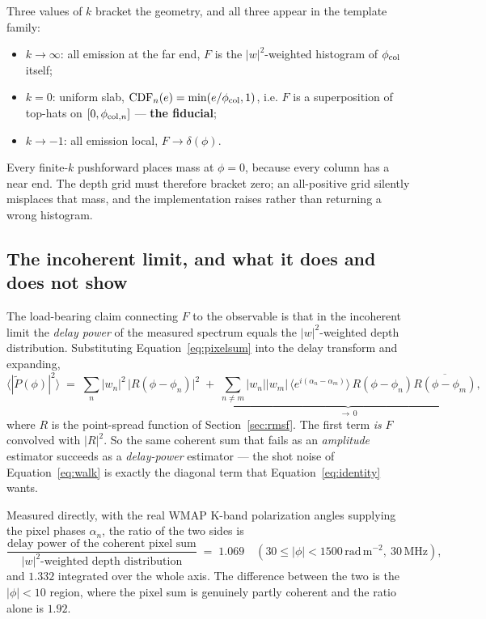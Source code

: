 \documentclass[11pt]{article}
\newcommand{\rmu}{\ensuremath{\mathrm{rad\,m^{-2}}}}
\begin{document}
Three values of $k$ bracket the geometry, and all three appear in the
template family:
\begin{itemize}
  \item $k \to \infty$: all emission at the far end,
    $F$ is the $|w|^2$-weighted histogram of $\phi_{\rm col}$ itself;
  \item $k = 0$: uniform slab, $\mathrm{CDF}_n(e) = \min(e/\phi_{\rm
    col},1)$, i.e. $F$ is a superposition of top-hats on
    $[0,\phi_{{\rm col},n}]$ --- \textbf{the fiducial};
  \item $k \to -1$: all emission local, $F \to \delta(\phi)$.
\end{itemize}

Every finite-$k$ pushforward places mass at $\phi = 0$, because every
column has a near end. The depth grid must therefore bracket zero; an
all-positive grid silently misplaces that mass, and the implementation
raises rather than returning a wrong histogram.

\subsection{The incoherent limit, and what it does and does not show}
\label{sec:identity}

The load-bearing claim connecting $F$ to the observable is that in the
incoherent limit the \emph{delay power} of the measured spectrum equals
the $|w|^2$-weighted depth distribution. Substituting
Equation~\eqref{eq:pixelsum} into the delay transform and expanding,
\begin{equation}
  \bigl\langle |\tilde P(\phi)|^2 \bigr\rangle
  \;=\; \sum_{n} |w_n|^2 \,\bigl|R(\phi - \phi_n)\bigr|^2
  \;+\; \underbrace{\sum_{n \ne m} |w_n||w_m|\,
    \bigl\langle e^{i(\alpha_n - \alpha_m)}\bigr\rangle\,
    R(\phi-\phi_n) \overline{R(\phi-\phi_m)}}_{\to\,0},
  \label{eq:identity}
\end{equation}
where $R$ is the point-spread function of Section~\ref{sec:rmsf}. The
first term \emph{is} $F$ convolved with $|R|^2$. So the same coherent sum
that fails as an \emph{amplitude} estimator succeeds as a
\emph{delay-power} estimator --- the shot noise of
Equation~\eqref{eq:walk} is exactly the diagonal term that
Equation~\eqref{eq:identity} wants.

Measured directly, with the real WMAP K-band polarization angles
\citep{bennett2013} supplying the pixel phases $\alpha_n$, the ratio of
the two sides is
\begin{equation}
  \frac{\text{delay power of the coherent pixel sum}}{|w|^2\text{-weighted
  depth distribution}} \;=\; 1.069
  \quad (30 \le |\phi| < 1500\,\rmu,\ 30\,\text{MHz}),
\end{equation}
and $1.332$ integrated over the whole axis. The difference between the
two is the $|\phi| < 10$ region, where the pixel sum is genuinely partly
coherent and the ratio alone is $1.92$.
\end{document}
